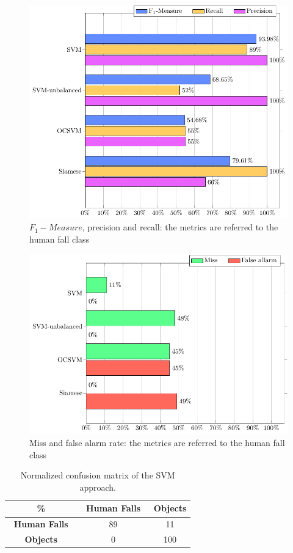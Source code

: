 \begin{figure}[htb]
	\includegraphics[width=\linewidth]{img/prai/results_f1/results_f1}
	\caption{$ F_1 -Measure$, precision and recall: the metrics are referred to the human fall class}
	\label{fig:results_f1}
\end{figure}
\begin{figure}
	\includegraphics[width=\linewidth]{img/prai/results_fn_fp/results_fn_fp}
	\caption{Miss and false alarm rate: the metrics are referred to the human fall class}
	\label{fig:results_fn_fp}
\end{figure}
\begin{table}[htb]
	\caption{Normalized confusion matrix of the SVM approach.}
	\label{tab:cm_svm}
	\begin{center}
		
		\begin{tabular}[htb]{c|c|c}	
			\hline
			\textbf{\%} & \textbf{$\,$ Human Falls $\,$ } & \textbf{Objects} \\ %
			
			\hline
			\textbf{$\,$ Human Falls $\,$ }     			& 89    &   11     \\
			\textbf{Objects} 								& 0    &   100     	\\
			\hline
		\end{tabular}
	\end{center}
\end{table}
